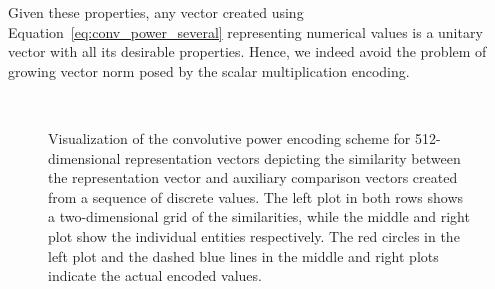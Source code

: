 Given these properties, any vector created using Equation~\eqref{eq:conv_power_several} representing numerical values is a unitary vector with all its desirable properties.
Hence, we indeed avoid the problem of growing vector norm posed by the scalar multiplication encoding.

\begin{figure}[t]
    \centering
    \\
    \caption{
        Visualization of the convolutive power encoding scheme for \num{512}-dimensional representation vectors depicting the similarity between the representation vector and auxiliary comparison vectors created from a sequence of discrete values.
        The left plot in both rows shows a two-dimensional grid of the similarities, while the middle and right plot show the individual entities respectively.
        The red circles in the left plot and the dashed blue lines in the middle and right plots indicate the
    actual encoded values.}
    \label{fig:spa_power_encoding}
\end{figure}

